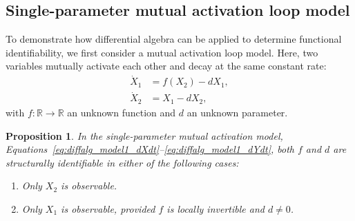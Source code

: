 \documentclass{article}
\theoremstyle{plain}
\newtheorem{proposition}{Proposition}[section]
\theoremstyle{definition}
\begin{document}
{\subsection{Single-parameter mutual activation loop model} \label{sec:diffalg_one_parameter}

To demonstrate how differential algebra can be applied to determine functional identifiability, we first consider a mutual activation loop model. Here, two variables mutually activate each other and decay at the same constant rate:
\begin{align}
    \dot{X}_1 &= f(X_2) - dX_1, \label{eq:diffalg_model1_dXdt} \\
    \dot{X}_2 &= X_1 - dX_2,   \label{eq:diffalg_model1_dYdt}
\end{align}
with $f:\mathbb{R}\to\mathbb{R}$ an unknown function and $d$ an unknown parameter.

\begin{proposition} \label{prop:diffalg_one_parameter_identifiability}\label{prop:diffalg_case1}\label{prop:diffalg_case2}
In the single-parameter mutual activation model, Equations~\eqref{eq:diffalg_model1_dXdt}--\eqref{eq:diffalg_model1_dYdt}, both $f$ and $d$ are structurally identifiable in either of the following cases:
\begin{enumerate}
    \item Only $X_2$ is observable.
    \item Only $X_1$ is observable, provided $f$ is locally invertible and $d \neq 0$.
\end{enumerate}
\end{proposition}

}
\end{document}
